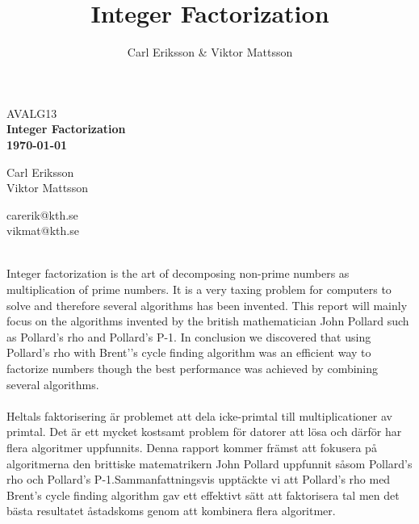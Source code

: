 \documentclass[a4paper,12pt]{article}
\author{Carl Eriksson & Viktor Mattsson}
\begin{document}
\title{Integer Factorization}   
    
	\begin{titlepage}
    	\centering
    	\small
    	AVALG13\\
    	\vspace*{6\baselineskip}
    	\Large
    	\bfseries
    	Integer Factorization\\
    	\normalsize
        \textbf{\today} \\[2\baselineskip]

        \begin{minipage}{0.4\textwidth}
        \begin{flushleft} 
        Carl Eriksson\\
        Viktor Mattsson\\
        \end{flushleft}
        \end{minipage}
        \begin{minipage}{0.25\textwidth}
        \begin{flushleft} 
        carerik@kth.se\\
        vikmat@kth.se\\
        \end{flushleft}
        \end{minipage}

        \vspace*{10\baselineskip}
    \end{titlepage}

    \newpage

    \\

    Integer factorization is the art of decomposing non-prime numbers as multiplication of prime numbers. It is a very taxing problem for computers to solve and therefore several algorithms has been invented. This report will mainly focus on the algorithms invented by the british mathematician John Pollard such as Pollard’s rho and Pollard’s P-1. In conclusion we discovered that using Pollard’s rho with Brent’’s cycle finding algorithm was an efficient way to factorize numbers though the best performance was achieved by combining several algorithms.\\

    \\

    Heltals faktorisering är problemet att dela icke-primtal till multiplicationer av primtal. Det är ett mycket kostsamt problem för datorer att lösa och därför har flera algoritmer uppfunnits. Denna rapport kommer främst att fokusera på algoritmerna den brittiske matematrikern John Pollard uppfunnit såsom Pollard’s rho och Pollard’s P-1.Sammanfattningsvis upptäckte vi att Pollard’s rho med Brent’s cycle finding algorithm gav ett effektivt sätt att faktorisera tal men det bästa resultatet åstadskoms genom att kombinera flera algoritmer.
\end{document}

